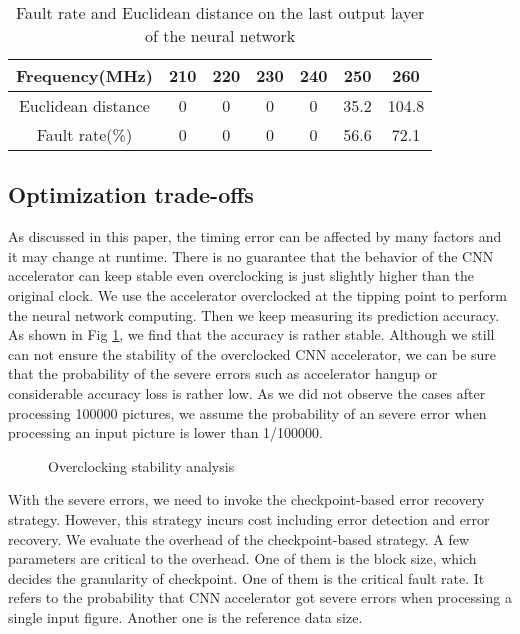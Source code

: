 \begin{table}
        \centering
        \vspace{-0.3em}
        \caption{Fault rate and Euclidean distance on the last output layer of the neural network}
        \label{tab:fr_ed}
        \vspace{-0.3em}
        \begin{tabular}{c|cccccc}
                \toprule
                Frequency(MHz) & 210 & 220 & 230 & 240 & 250 & 260 \\
                \midrule
                Euclidean distance & 0 & 0 & 0 & 0 & 35.2 & 104.8 \\
		\midrule
                Fault rate(\%) & 0 & 0 & 0 & 0 & 56.6 & 72.1 \\
                \bottomrule
        \end{tabular}
        \vspace{-1em}
\end{table}

\subsection{Optimization trade-offs}
As discussed in this paper, the timing error can be affected by many factors and it may change 
at runtime. There is no guarantee that the behavior of the CNN accelerator can keep stable even 
overclocking is just slightly higher than the original clock. We use the accelerator overclocked at the 
tipping point to perform the neural network computing. Then we keep measuring its 
prediction accuracy. As shown in Fig \ref{fig:stability}, we find that the accuracy is rather stable.
Although we still can not ensure the stability of the overclocked CNN accelerator, we can 
be sure that the probability of the severe errors such as accelerator hangup or considerable 
accuracy loss is rather low. As we did not observe the cases after processing 100000 pictures, 
we assume the probability of an severe error when processing an input picture is lower than 1/100000.

\begin{figure}
    \caption{Overclocking stability analysis}
\label{fig:stability}
\vspace{-1em}
\end{figure}


With the severe errors, we need to invoke the checkpoint-based error recovery strategy. 
However, this strategy incurs cost including error detection and error recovery. 
We evaluate the overhead of the checkpoint-based strategy. 
A few parameters are critical to the overhead. One of them is the block size, which 
decides the granularity of checkpoint. One of them is the critical 
fault rate. It refers to the probability that CNN accelerator got severe errors 
when processing a single input figure. Another one is the reference data size.

